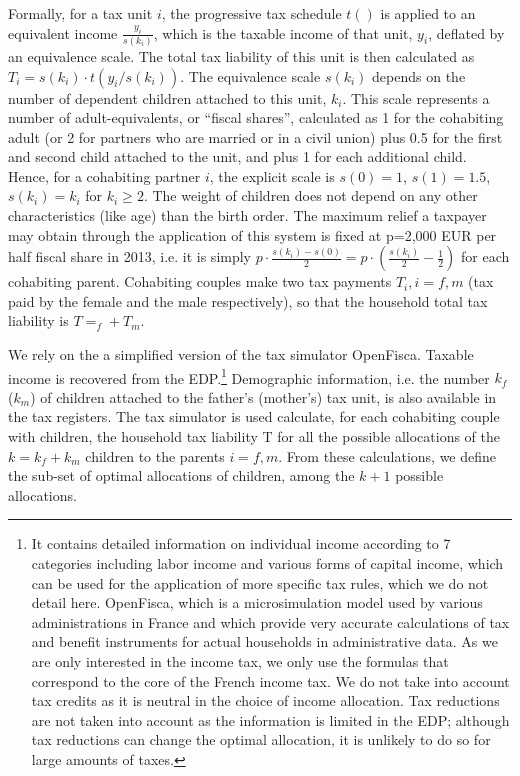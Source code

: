 Formally, for a tax unit $i$, the progressive tax schedule $t()$ is applied to an equivalent income $\frac{y_i}{s(k_i)}$, which is the taxable income of that unit, $y_i$, deflated by an equivalence scale. The total tax liability of this unit is then calculated as $T_i=s(k_i)\cdot t(y_i/s(k_i ) )$. The equivalence scale $s(k_i)$ depends on the number of dependent children attached to this unit, $k_i$. This scale represents a number of adult-equivalents, or “fiscal shares”, calculated as 1 for the cohabiting adult (or 2 for partners who are married or in a civil union) plus 0.5 for the first and second child attached to the unit, and plus 1 for each additional child. Hence, for a cohabiting partner $i$, the explicit scale is $s(0)=1$, $s(1)=1.5$, $s(k_i )=k_i$ for $k_i\geq2$. The weight of children does not depend on any other characteristics (like age) than the birth order. The maximum relief a taxpayer may obtain through the application of this system is fixed at p=2,000 EUR per half fiscal share in 2013, i.e. it is simply $p\cdot\frac{s(k_i )-s(0)}{2}=p\cdot (\frac{  s(k_i )}{2}-\frac{1}{2})$ for each cohabiting parent. Cohabiting couples make two tax payments $T_i, i=f,m $ (tax paid by the female and the male respectively), so that the household total tax liability is $T=_f+T_m$.

\medskip
We rely on the a simplified version of the tax simulator OpenFisca. Taxable income is recovered from the EDP.\footnote{
    It contains detailed information on individual income according to 7 categories including labor income and various forms of capital income, which can be used for the application of more specific tax rules, which we do not detail here. OpenFisca, which is a microsimulation model used by various administrations in France and which provide very accurate calculations of tax and benefit instruments for actual households in administrative data. As we are only interested in the income tax, we only use the formulas that correspond to the core of the French income tax. We do not take into account tax credits as it is neutral in the choice of income allocation. Tax reductions are not taken into account as the information is limited in the EDP; although tax reductions can change the optimal allocation, it is unlikely to do so for large amounts of taxes.
    } 
Demographic information, i.e. the number $k_f$  ($k_m$) of children attached to the father’s (mother’s) tax unit, is also available in the tax registers. The tax simulator is used calculate, for each cohabiting couple with children, the household tax liability T for all the possible allocations of the $k=k_f+k_m$  children to the parents $i=f,m$. From these calculations, we define the sub-set of optimal allocations of children, among the $k+1$ possible allocations. 


